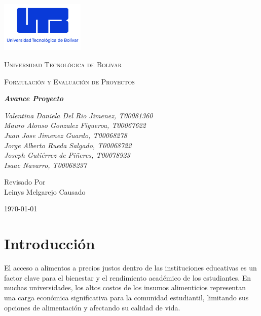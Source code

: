 \documentclass[letterpaper, 11pt]{report}
\begin{document}
\begin{titlepage}
      \centering
      \includegraphics[width=0.3\textwidth]{Images/logo_utb.png}\par\vspace{1cm}
      {\scshape\LARGE Universidad Tecnológica de Bolívar \par}
      \vspace{1cm}

      {\scshape\Large Formulación y Evaluación de Proyectos \par}
      \vspace{1cm}

      \slshape {\Large \bfseries{} Avance Proyecto \\}
      \vspace{2cm}

      \slshape {\itshape{} Valentina Daniela Del Rio Jimenez, T00081360 \\}
      \slshape {\itshape{} Mauro Alonso Gonzalez Figueroa, T00067622 \\}
      \slshape {\itshape{} Juan Jose Jimenez Guardo, T00068278 \\}
      \slshape {\itshape{} Jorge Alberto Rueda Salgado, T00068722 \\}
      \slshape {\itshape{} Joseph Gutiérrez de Piñeres, T00078923  \\}
      \slshape {\itshape{} Isaac Navarro, T00068237  \\}

      \vfill
      Revisado Por \\
      Leinys Melgarejo Causado\\
      {\large \today\par}
\end{titlepage}

\nocite{*}

\tableofcontents{}
\newpage

\section{Introducción}

El acceso a alimentos a precios justos dentro de las instituciones educativas
es un factor clave para el bienestar y el rendimiento académico de los
estudiantes. En muchas universidades, los altos costos de los insumos
alimenticios representan una carga económica significativa para la comunidad
estudiantil, limitando sus opciones de alimentación y afectando su calidad de
vida.
\end{document}

